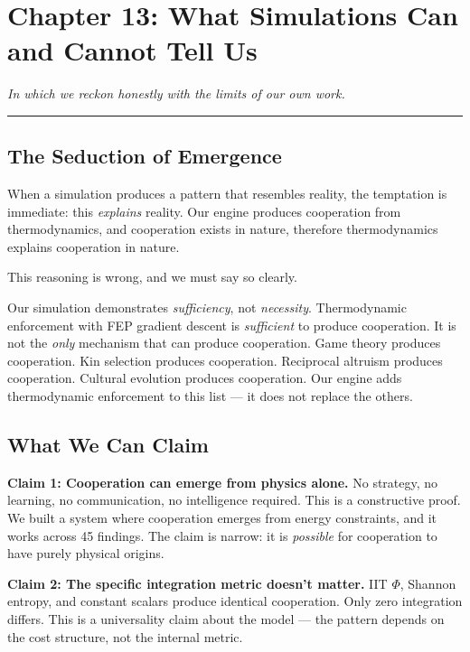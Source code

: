 \chapter{Chapter 13: What Simulations Can and Cannot Tell Us}\label{chapter-13-what-simulations-can-and-cannot-tell-us}

\emph{In which we reckon honestly with the limits of our own work.}

\begin{center}\rule{0.5\linewidth}{0.5pt}\end{center}

\section{The Seduction of Emergence}\label{the-seduction-of-emergence}

When a simulation produces a pattern that resembles reality, the temptation is immediate: this \emph{explains} reality. Our engine produces cooperation from thermodynamics, and cooperation exists in nature, therefore thermodynamics explains cooperation in nature.

This reasoning is wrong, and we must say so clearly.

Our simulation demonstrates \emph{sufficiency}, not \emph{necessity}. Thermodynamic enforcement with FEP gradient descent is \emph{sufficient} to produce cooperation. It is not the \emph{only} mechanism that can produce cooperation. Game theory produces cooperation. Kin selection produces cooperation. Reciprocal altruism produces cooperation. Cultural evolution produces cooperation. Our engine adds thermodynamic enforcement to this list --- it does not replace the others.

\section{What We Can Claim}\label{what-we-can-claim}

\textbf{Claim 1: Cooperation can emerge from physics alone.} No strategy, no learning, no communication, no intelligence required. This is a constructive proof. We built a system where cooperation emerges from energy constraints, and it works across 45 findings. The claim is narrow: it is \emph{possible} for cooperation to have purely physical origins.

\textbf{Claim 2: The specific integration metric doesn't matter.} IIT $\Phi$, Shannon entropy, and constant scalars produce identical cooperation. Only zero integration differs. This is a universality claim about the model --- the pattern depends on the cost structure, not the internal metric.

